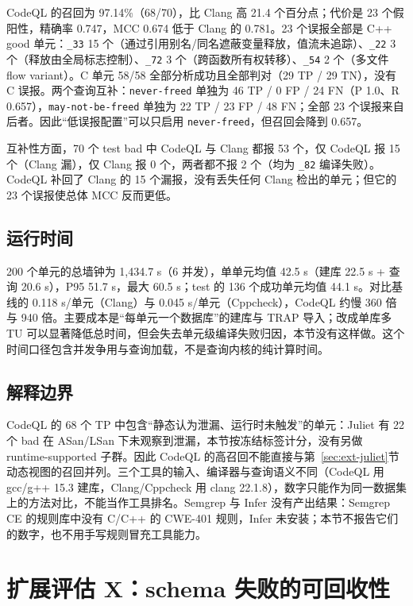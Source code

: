 \documentclass[conference]{IEEEtran}
\begin{document}
CodeQL 的召回为 97.14\%（68/70），比 Clang 高 21.4 个百分点；代价是 23 个假阳性，精确率 0.747，MCC 0.674 低于 Clang 的 0.781。23 个误报全部是 C++ good 单元：\texttt{\_33} 15 个（通过引用别名/同名遮蔽变量释放，值流未追踪）、\texttt{\_22} 3 个（释放由全局标志控制）、\texttt{\_72} 3 个（跨函数所有权转移）、\texttt{\_54} 2 个（多文件 flow variant）。C 单元 58/58 全部分析成功且全部判对（29 TP / 29 TN），没有 C 误报。两个查询互补：\texttt{never-freed} 单独为 46 TP / 0 FP / 24 FN（P 1.0、R 0.657），\texttt{may-not-be-freed} 单独为 22 TP / 23 FP / 48 FN；全部 23 个误报来自后者。因此“低误报配置”可以只启用 \texttt{never-freed}，但召回会降到 0.657。

互补性方面，70 个 test bad 中 CodeQL 与 Clang 都报 53 个，仅 CodeQL 报 15 个（Clang 漏），仅 Clang 报 0 个，两者都不报 2 个（均为 \texttt{\_82} 编译失败）。CodeQL 补回了 Clang 的 15 个漏报，没有丢失任何 Clang 检出的单元；但它的 23 个误报使总体 MCC 反而更低。

\subsection{运行时间}

200 个单元的总墙钟为 1{,}434.7 s（6 并发），单单元均值 42.5 s（建库 22.5 s + 查询 20.6 s），P95 51.7 s，最大 60.5 s；test 的 136 个成功单元均值 44.1 s。对比基线的 0.118 s/单元（Clang）与 0.045 s/单元（Cppcheck），CodeQL 约慢 360 倍与 940 倍。主要成本是“每单元一个数据库”的建库与 TRAP 导入；改成单库多 TU 可以显著降低总时间，但会失去单元级编译失败归因，本节没有这样做。这个时间口径包含并发争用与查询加载，不是查询内核的纯计算时间。

\subsection{解释边界}

CodeQL 的 68 个 TP 中包含“静态认为泄漏、运行时未触发”的单元：Juliet 有 22 个 bad 在 ASan/LSan 下未观察到泄漏，本节按冻结标签计分，没有另做 runtime-supported 子群。因此 CodeQL 的高召回不能直接与第~\ref{sec:ext-juliet}节动态视图的召回并列。三个工具的输入、编译器与查询语义不同（CodeQL 用 gcc/g++ 15.3 建库，Clang/Cppcheck 用 clang 22.1.8），数字只能作为同一数据集上的方法对比，不能当作工具排名。Semgrep 与 Infer 没有产出结果：Semgrep CE 的规则库中没有 C/C++ 的 CWE-401 规则，Infer 未安装；本节不报告它们的数字，也不用手写规则冒充工具能力。

\section{扩展评估 X：schema 失败的可回收性}
\label{sec:schema}
\end{document}
